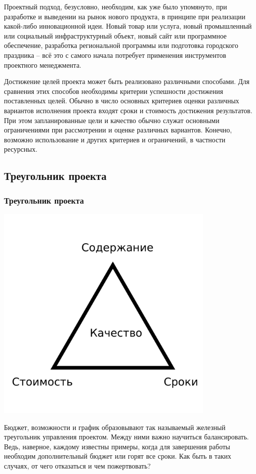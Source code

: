 \documentclass{../industrial-development}
\begin{document}
Проектный подход, безусловно, необходим, как уже было упомянуто, при разработке и выведении на рынок нового продукта, в принципе при реализации какой-либо инновационной идеи. Новый товар или услуга, новый промышленный или социальный инфраструктурный объект, новый сайт или программное обеспечение, разработка региональной программы или подготовка городского праздника – всё это с самого начала потребует применения инструментов проектного менеджмента.
    
Достижение целей проекта может быть реализовано различными способами. Для сравнения этих способов необходимы критерии успешности достижения поставленных целей. Обычно в число основных критериев оценки различных вариантов исполнения проекта входят сроки и стоимость достижения результатов. При этом запланированные цели и качество обычно служат основными ограничениями при рассмотрении и оценке различных вариантов. Конечно, возможно использование и других критериев и ограничений, в частности ресурсных.

    \subsection{Треугольник проекта}

    \begin{frame} \frametitle{Треугольник проекта}
         \centerline{\includegraphics[width=0.8\textwidth]{triangle.pdf}}
    \end{frame}
    \lecturenotes

Бюджет, возможности и график образовывают так называемый железный треугольник управления проектом. Между ними важно научиться балансировать. Ведь, наверное, каждому известны примеры, когда для завершения работы необходим дополнительный бюджет или горят все сроки. Как быть в таких случаях, от чего отказаться и чем пожертвовать?
    
\end{document}
